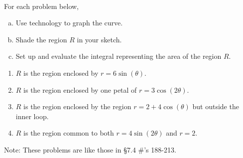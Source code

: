 \documentclass[11pt,fleqn]{article}
\begin{document}
\renewcommand{\headrulewidth}{0pt}
\newcommand{\blank}[1]{\rule{#1}{0.75pt}}
\newcommand{\bc}{\begin{center}}
\newcommand{\ec}{\end{center}}
\renewcommand{\d}{\displaystyle}

\vspace*{-0.7in}

\begin{center}
  \large
  \\
\end{center}
For each problem below,\\
	\begin{enumerate}[a.]
	\item Use technology to graph the curve.
	\item Shade the region $R$ in your sketch.
	\item Set up and evaluate the integral representing the area of the region $R$.
	\end{enumerate}
	
\vspace{.3in}

\begin{enumerate}
\item $R$ is the region enclosed by $\d r=6\sin(\theta).$
\item $R$ is the region enclosed by one petal of $\d r=3\cos(2 \theta).$
\item $R$ is the region enclosed by the region $r=2+4\cos(\theta)$ but outside the inner loop.
\item $R$ is the region common to both $r=4\sin(2 \theta)$ and $r=2.$
\end{enumerate}

\vspace{.3in}

Note: These problems are like those in \S 7.4 \#'s 188-213.
\end{document}
